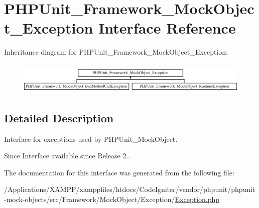 \hypertarget{interface_p_h_p_unit___framework___mock_object___exception}{}\section{P\+H\+P\+Unit\+\_\+\+Framework\+\_\+\+Mock\+Object\+\_\+\+Exception Interface Reference}
\label{interface_p_h_p_unit___framework___mock_object___exception}
Inheritance diagram for P\+H\+P\+Unit\+\_\+\+Framework\+\_\+\+Mock\+Object\+\_\+\+Exception\+:\begin{figure}[H]
\begin{center}
\leavevmode
\includegraphics[height=1.559888cm]{interface_p_h_p_unit___framework___mock_object___exception}
\end{center}
\end{figure}


\subsection{Detailed Description}
Interface for exceptions used by P\+H\+P\+Unit\+\_\+\+Mock\+Object.

\begin{DoxySince}{Since}
Interface available since Release 2.. 
\end{DoxySince}


The documentation for this interface was generated from the following file\+:\begin{DoxyCompactItemize}
\item 
/\+Applications/\+X\+A\+M\+P\+P/xamppfiles/htdocs/\+Code\+Igniter/vendor/phpunit/phpunit-\/mock-\/objects/src/\+Framework/\+Mock\+Object/\+Exception/\mbox{\hyperlink{phpunit_2phpunit-mock-objects_2src_2_framework_2_mock_object_2_exception_2_exception_8php}{Exception.\+php}}\end{DoxyCompactItemize}
